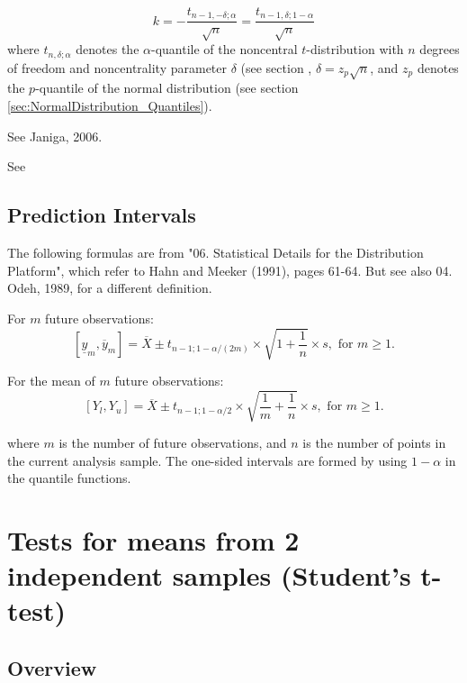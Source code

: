 \begin{equation}
	k=-\frac{t_{n-1,-\delta;\alpha}}{\sqrt{n}} =\frac{t_{n-1,\delta;1-\alpha}}{\sqrt{n}}
\end{equation}
where $t_{n,\delta;\alpha}$ denotes the $\alpha$-quantile of the noncentral $t$-distribution with $n$ degrees of freedom and noncentrality parameter $\delta$ (see section 
, $\delta=z_p \sqrt{n}$, and $z_p$ denotes the $p$-quantile of the normal distribution (see section \ref{sec:NormalDistribution_Quantiles}).

See Janiga, 2006.

See \cite{odeh_tables_1980}



\subsection{Prediction Intervals}
The following formulas are from "06. Statistical Details for the Distribution Platform", which refer to  Hahn and Meeker (1991), pages 61-64. But see also 04. Odeh, 1989, for a different definition.

For $m$ future observations:
\begin{equation}
	\left[\underline{y}_m,\overline{y}_m \right] = \overline{X}\pm t_{n-1;1-\alpha/(2m)} \times \sqrt{1+\frac{1}{n}} \times s, \text{ for } m\geq1.
\end{equation}


For the mean of $m$ future observations:
\begin{equation}
	\left[Y_l,Y_u\right] = \overline{X}\pm t_{n-1;1-\alpha/2} \times \sqrt{\frac{1}{m}+\frac{1}{n}} \times s, \text{ for } m\geq1.
\end{equation}

where $m$ is the number of future observations, and $n$ is the number of points in the current analysis sample. The one-sided intervals are formed by using $1-\alpha$ in the quantile functions.



\newpage
\section{Tests for means from 2 independent samples (Student's t-test)}
\label{2iSampleTTest}

\subsection{Overview}
\label{2iSampleTTestOverview}

